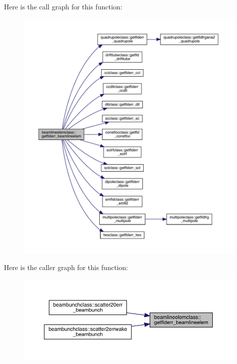 Here is the call graph for this function\+:\nopagebreak
\begin{figure}[H]
\begin{center}
\leavevmode
\includegraphics[width=350pt]{namespacebeamlineelemclass_aa711cecfd3c01152cb0d88d88b645c4b_cgraph}
\end{center}
\end{figure}
Here is the caller graph for this function\+:\nopagebreak
\begin{figure}[H]
\begin{center}
\leavevmode
\includegraphics[width=350pt]{namespacebeamlineelemclass_aa711cecfd3c01152cb0d88d88b645c4b_icgraph}
\end{center}
\end{figure}
\mbox{\label{namespacebeamlineelemclass_a52595a459a442685b5ab427a2fdb27c8}} 
